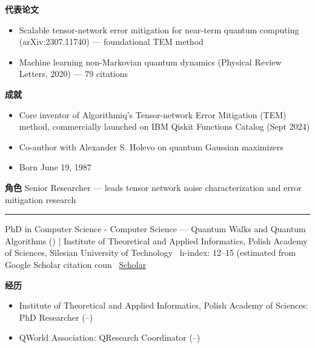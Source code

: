 \par{\footnotesize\color{mainred}\textbf{代表论文}}
\begin{itemize}[leftmargin=1.2em,itemsep=0pt,topsep=0pt]
\item {\footnotesize Scalable tensor-network error mitigation for near-term quantum computing (arXiv:2307.11740) — foundational TEM method}
\item {\footnotesize Machine learning non-Markovian quantum dynamics (Physical Review Letters, 2020) — 79 citations}
\end{itemize}
\par{\footnotesize\color{mainred}\textbf{成就}}
\begin{itemize}[leftmargin=1.2em,itemsep=0pt,topsep=0pt]
\item {\footnotesize Core inventor of Algorithmiq's Tensor-network Error Mitigation (TEM) method, commercially launched on IBM Qiskit Functions Catalog (Sept 2024)}
\item {\footnotesize Co-author with Alexander S. Holevo on quantum Gaussian maximizers}
\item {\footnotesize Born June 19, 1987}
\end{itemize}
\par{\footnotesize\color{mainred}\textbf{角色}} {\footnotesize Senior Researcher — leads tensor network noise characterization and error mitigation research}
\vspace{2pt}\hrule\vspace{2pt}
\vspace{4pt}
\par{\footnotesize\color{graytext}PhD in Computer Science - Computer Science — Quantum Walks and Quantum Algorithms () | Institute of Theoretical and Applied Informatics, Polish Academy of Sciences, Silesian University of Technology \textbar\  h-index: 12–15 (estimated from Google Scholar citation coun \textbar\  \href{https://scholar.google.com/citations?user=3f3cR0AAAAAJ}{Scholar}}
\par{\footnotesize\color{mainred}\textbf{经历}}
\begin{itemize}[leftmargin=1.2em,itemsep=0pt,topsep=0pt]
\item {\footnotesize Institute of Theoretical and Applied Informatics, Polish Academy of Sciences: PhD Researcher (–)}
\item {\footnotesize QWorld Association: QResearch Coordinator (–)}
\end{itemize}
